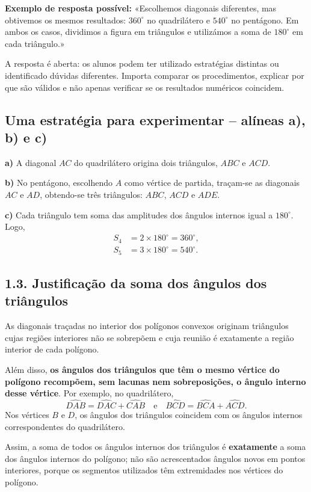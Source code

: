 \textbf{Exemplo de resposta possível:}
«Escolhemos diagonais diferentes, mas obtivemos os mesmos resultados:
$360^\circ$ no quadrilátero e $540^\circ$ no pentágono.
Em ambos os casos, dividimos a figura em triângulos e utilizámos a
soma de $180^\circ$ em cada triângulo.»

A resposta é aberta: os alunos podem ter utilizado estratégias distintas
ou identificado dúvidas diferentes. Importa comparar os procedimentos,
explicar por que são válidos e não apenas verificar se os resultados
numéricos coincidem.

\subsection*{Uma estratégia para experimentar -- alíneas a), b) e c)}

\textbf{a)} A diagonal $AC$ do quadrilátero origina dois triângulos,
$ABC$ e $ACD$.

\textbf{b)} No pentágono, escolhendo $A$ como vértice de partida,
traçam-se as diagonais $AC$ e $AD$, obtendo-se três triângulos:
$ABC$, $ACD$ e $ADE$.

\textbf{c)} Cada triângulo tem soma das amplitudes dos ângulos
internos igual a $180^\circ$. Logo,
\[
\begin{aligned}
S_4&=2\times180^\circ=360^\circ,\\
S_5&=3\times180^\circ=540^\circ.
\end{aligned}
\]

\subsection*{1.3. Justificação da soma dos ângulos dos triângulos}

As diagonais traçadas no interior dos polígonos convexos
originam triângulos cujas regiões interiores não se sobrepõem
e cuja reunião é exatamente a região interior de cada polígono.

Além disso, \textbf{os ângulos dos triângulos que têm o mesmo vértice
do polígono recompõem, sem lacunas nem sobreposições, o ângulo
interno desse vértice}. Por exemplo, no quadrilátero,
\[
\widehat{DAB}=\widehat{DAC}+\widehat{CAB}
\quad\text{e}\quad
\widehat{BCD}=\widehat{BCA}+\widehat{ACD}.
\]
Nos vértices $B$ e $D$, os ângulos dos triângulos coincidem
com os ângulos internos correspondentes do quadrilátero.

Assim, a soma de todos os ângulos internos dos triângulos é
\textbf{exatamente} a soma dos ângulos internos do polígono;
não são acrescentados ângulos novos em pontos interiores, porque
os segmentos utilizados têm extremidades nos vértices do polígono.

